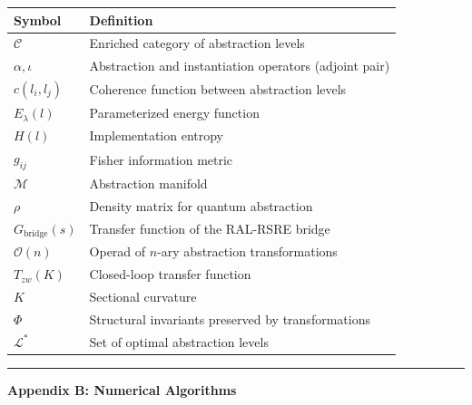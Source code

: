 \documentclass[
]{article}
\newcounter{none} %
\begin{document}
{\def\LTcaptype{none} %
\begin{longtable}[]{@{}
  >{\raggedright\arraybackslash}p{}
  >{\raggedright\arraybackslash}p{}@{}}
\toprule\noalign{}
\begin{minipage}[b]{\linewidth}\raggedright
Symbol
\end{minipage} & \begin{minipage}[b]{\linewidth}\raggedright
Definition
\end{minipage} \\
\midrule\noalign{}
\endhead
\bottomrule\noalign{}
\endlastfoot
\(\mathcal{C}\) & Enriched category of abstraction levels \\
\(\alpha, \iota\) & Abstraction and instantiation operators (adjoint
pair) \\
\(c(l_i, l_j)\) & Coherence function between abstraction levels \\
\(E_{\lambda}(l)\) & Parameterized energy function \\
\(H(l)\) & Implementation entropy \\
\(g_{ij}\) & Fisher information metric \\
\(\mathcal{M}\) & Abstraction manifold \\
\(\rho\) & Density matrix for quantum abstraction \\
\(G_{\text{bridge}}(s)\) & Transfer function of the RAL-RSRE bridge \\
\(\mathcal{O}(n)\) & Operad of \(n\)-ary abstraction transformations \\
\(T_{zw}(K)\) & Closed-loop transfer function \\
\(K\) & Sectional curvature \\
\(\Phi\) & Structural invariants preserved by transformations \\
\(\mathcal{L}^*\) & Set of optimal abstraction levels \\
\end{longtable}
}

\begin{center}\rule{0.5\linewidth}{0.5pt}\end{center}

\textbf{Appendix B: Numerical Algorithms}
\end{document}
